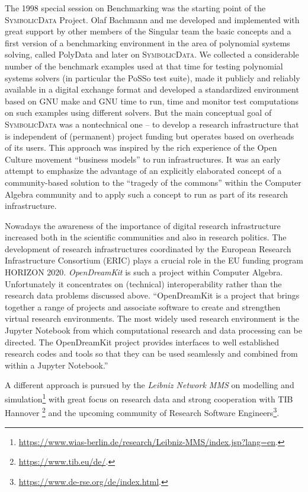 \documentclass[a4paper,11pt]{article}
\def\SD{\textsc{SymbolicData}}
\begin{document}
The 1998 special session on Benchmarking was the starting point of the {\SD}
Project. Olaf Bachmann and me developed and implemented with great support by
other members of the Singular team the basic concepts and a first version of a
benchmarking environment in the area of polynomial systems solving, called {\sc
  PolyData} and later on {\SD}.  We collected a considerable number of the
benchmark examples used at that time for testing polynomial systems solvers (in
particular the PoSSo test suite), made it publicly and reliably available in a
digital exchange format and developed a standardized environment based on GNU
make and GNU time to run, time and monitor test computations on such examples
using different solvers. But the main conceptual goal of {\SD} was a
nontechnical one – to develop a research infrastructure that is independent of
(permanent) project funding but operates based on overheads of its users. This
approach was inspired by the rich experience of the Open Culture movement
“business models” to run infrastructures. It was an early attempt to emphasize
the advantage of an explicitly elaborated concept of a community-based solution
to the “tragedy of the commons” within the Computer Algebra community and to
apply such a concept to run as part of its research infrastructure.

Nowadays the awareness of the importance of digital research infrastructure
increased both in the scientific communities and also in research politics.
The development of research infrastructures coordinated by the European
Research Infrastructure Consortium (ERIC) plays a crucial role in the EU
funding program HORIZON 2020. \emph{OpenDreamKit} is such a project within
Computer Algebra.  Unfortunately it concentrates on (technical)
interoperability rather than the research data problems discussed above.
``OpenDreamKit is a project that brings together a range of projects and
associate software to create and strengthen virtual research environments. The
most widely used research environment is the Jupyter Notebook from which
computational research and data processing can be directed. The OpenDreamKit
project provides interfaces to well established research codes and tools so
that they can be used seamlessly and combined from within a Jupyter Notebook.''

A different approach is pursued by the \emph{Leibniz Network MMS} on modelling
and
simulation\footnote{\url{https://www.wias-berlin.de/research/Leibniz-MMS/index.jsp?lang=en}.}
with great focus on research data and strong cooperation with TIB
Hannover \footnote{\url{https://www.tib.eu/de/}.} and the upcoming community of 
Research Software
Engineers\footnote{\url{https://www.de-rse.org/de/index.html}.}. 
\end{document}

